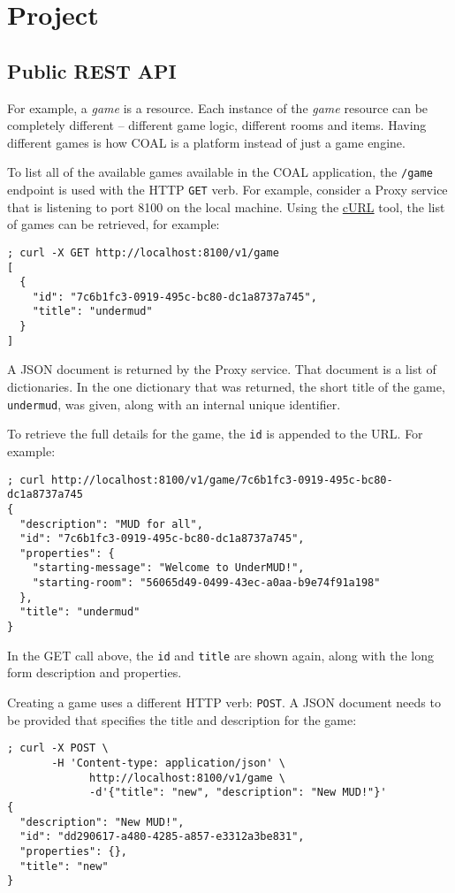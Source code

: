 \documentclass{article}
\newcommand{\enterProblemHeader}[1]{
}
\newcommand{\exitProblemHeader}[1]{
\nobreak\extramarks{#1}{}\nobreak
}
\newcounter{homeworkProblemCounter} %
\newcommand{\homeworkProblemName}{}
\newenvironment{homeworkProblem}[1][Problem \arabic{homeworkProblemCounter}]{ %
\stepcounter{homeworkProblemCounter} %
\renewcommand{\homeworkProblemName}{#1} %
\section{\homeworkProblemName} %
\enterProblemHeader{\homeworkProblemName} %
}{
\exitProblemHeader{\homeworkProblemName} %
}
\newcommand{\homeworkSectionName}{}
\newenvironment{homeworkSection}[1]{ %
\renewcommand{\homeworkSectionName}{#1} %
\subsection{\homeworkSectionName} %
\enterProblemHeader{\homeworkProblemName\ [\homeworkSectionName]} %
}{
\enterProblemHeader{\homeworkProblemName} %
}
\begin{document}
\begin{homeworkProblem}[Project]
\begin{homeworkSection}{Public REST API}
	For example, a \textit{game} is a resource. Each instance of the \textit{game} resource can be completely different -- different game logic, different rooms and items. Having different games is how COAL is a platform instead of just a game engine.

	To list all of the available games available in the COAL application, the \texttt{/game} endpoint is used with the HTTP \texttt{GET} verb. For example, consider a Proxy service that is listening to port 8100 on the local machine. Using the \href{https://curl.se/}{cURL} tool, the list of games can be retrieved, for example:

\begin{Verbatim}[fontsize=\small]
; curl -X GET http://localhost:8100/v1/game
[
  {
    "id": "7c6b1fc3-0919-495c-bc80-dc1a8737a745",
    "title": "undermud"
  }
]
\end{Verbatim}

	A JSON document is returned by the Proxy service. That document is a list of dictionaries. In the one dictionary that was returned, the short title of the game, \texttt{undermud}, was given, along with an internal unique identifier.

	To retrieve the full details for the game, the \texttt{id} is appended to the URL. For example:

\begin{Verbatim}[fontsize=\small]
; curl http://localhost:8100/v1/game/7c6b1fc3-0919-495c-bc80-dc1a8737a745
{
  "description": "MUD for all",
  "id": "7c6b1fc3-0919-495c-bc80-dc1a8737a745",
  "properties": {
    "starting-message": "Welcome to UnderMUD!",
    "starting-room": "56065d49-0499-43ec-a0aa-b9e74f91a198"
  },
  "title": "undermud"
}
\end{Verbatim}	

	In the GET call above, the \texttt{id} and \texttt{title} are shown again, along with the long form description and properties.

	Creating a game uses a different HTTP verb: \texttt{POST}. A JSON document needs to be provided that specifies the title and description for the game:

\begin{Verbatim}[fontsize=\small]
; curl -X POST \
       -H 'Content-type: application/json' \
			 http://localhost:8100/v1/game \
			 -d'{"title": "new", "description": "New MUD!"}'
{
  "description": "New MUD!",
  "id": "dd290617-a480-4285-a857-e3312a3be831",
  "properties": {},
  "title": "new"
}
\end{Verbatim}


\end{homeworkSection}
\end{homeworkProblem}
\end{document}
